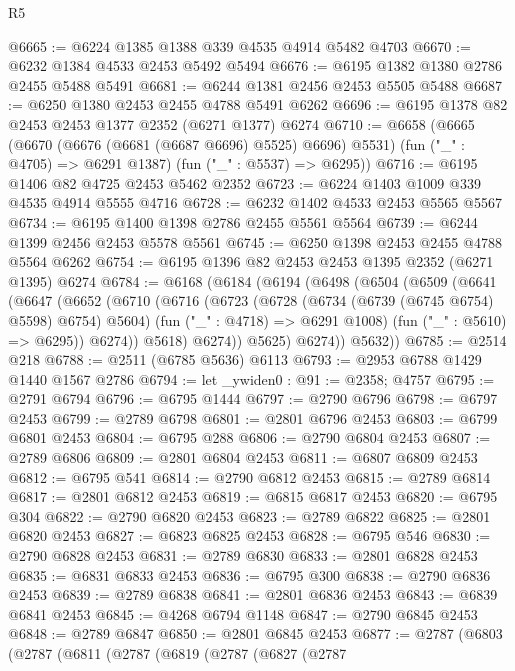\begin{lexlean}{R5}
\begin{coremodule}
@6665 := @6224 @1385 @1388 @339 @4535 @4914 @5482 @4703
@6670 := @6232 @1384 @4533 @2453 @5492 @5494
@6676 := @6195 @1382 @1380 @2786 @2455 @5488 @5491
@6681 := @6244 @1381 @2456 @2453 @5505 @5488
@6687 := @6250 @1380 @2453 @2455 @4788 @5491 @6262
@6696 := @6195 @1378 @82 @2453 @2453 @1377 @2352 (@6271 @1377) @6274
@6710 := @6658
    (@6665
      (@6670 (@6676 (@6681 (@6687 @6696) @5525) @6696) @5531)
      (fun ("_" : @4705) => @6291 @1387)
      (fun ("_" : @5537) => @6295))
@6716 := @6195 @1406 @82 @4725 @2453 @5462 @2352
@6723 := @6224 @1403 @1009 @339 @4535 @4914 @5555 @4716
@6728 := @6232 @1402 @4533 @2453 @5565 @5567
@6734 := @6195 @1400 @1398 @2786 @2455 @5561 @5564
@6739 := @6244 @1399 @2456 @2453 @5578 @5561
@6745 := @6250 @1398 @2453 @2455 @4788 @5564 @6262
@6754 := @6195 @1396 @82 @2453 @2453 @1395 @2352 (@6271 @1395) @6274
@6784 := @6168
    (@6184
      (@6194
        (@6498
          (@6504
            (@6509
              (@6641
                (@6647
                  (@6652
                    (@6710
                      (@6716
                        (@6723
                          (@6728 (@6734 (@6739 (@6745 @6754) @5598) @6754) @5604)
                          (fun ("_" : @4718) => @6291 @1008)
                          (fun ("_" : @5610) => @6295))
                        @6274))
                    @5618)
                  @6274))
              @5625)
            @6274))
        @5632))
@6785 := @2514 @218
@6788 := @2511 (@6785 @5636) @6113
@6793 := @2953 @6788 @1429 @1440 @1567 @2786
@6794 := let _ywiden0 : @91 := @2358; @4757
@6795 := @2791 @6794
@6796 := @6795 @1444
@6797 := @2790 @6796
@6798 := @6797 @2453
@6799 := @2789 @6798
@6801 := @2801 @6796 @2453
@6803 := @6799 @6801 @2453
@6804 := @6795 @288
@6806 := @2790 @6804 @2453
@6807 := @2789 @6806
@6809 := @2801 @6804 @2453
@6811 := @6807 @6809 @2453
@6812 := @6795 @541
@6814 := @2790 @6812 @2453
@6815 := @2789 @6814
@6817 := @2801 @6812 @2453
@6819 := @6815 @6817 @2453
@6820 := @6795 @304
@6822 := @2790 @6820 @2453
@6823 := @2789 @6822
@6825 := @2801 @6820 @2453
@6827 := @6823 @6825 @2453
@6828 := @6795 @546
@6830 := @2790 @6828 @2453
@6831 := @2789 @6830
@6833 := @2801 @6828 @2453
@6835 := @6831 @6833 @2453
@6836 := @6795 @300
@6838 := @2790 @6836 @2453
@6839 := @2789 @6838
@6841 := @2801 @6836 @2453
@6843 := @6839 @6841 @2453
@6845 := @4268 @6794 @1148
@6847 := @2790 @6845 @2453
@6848 := @2789 @6847
@6850 := @2801 @6845 @2453
@6877 := @2787
    (@6803
      (@2787
        (@6811
          (@2787
            (@6819
              (@2787
                (@6827
                  (@2787

\end{coremodule}
\end{lexlean}
